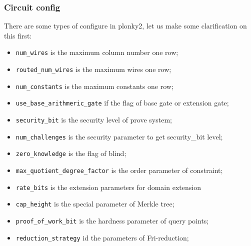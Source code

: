 \subsubsection{Circuit config} \label{sec:circuit-config}

There are some types of configure in plonky2, let us make some clarification on this first:
\begin{itemize}
    \item \verb|num_wires| is the maximum column number one row;
    \item \verb|routed_num_wires| is the maximum wires one row;
    \item \verb|num_constants| is the maximum constants one row; 
    \item \verb|use_base_arithmeric_gate| if the flag of base gate or extension gate;
    \item \verb|security_bit| is the security level of prove system;
    \item \verb|num_challenges| is the security parameter to get security\_bit level;
    \item \verb|zero_knowledge| is the flag of blind;
    \item \verb|max_quotient_degree_factor| is the order parameter of constraint; 
    \item \verb|rate_bits| is the extension parameters for domain extension
    \item \verb|cap_height| is the special parameter of Merkle tree;
    \item \verb|proof_of_work_bit| is the hardness parameter of query points;
    \item \verb|reduction_strategy| id the parameters of Fri-reduction;
\end{itemize}  


  
  
 
